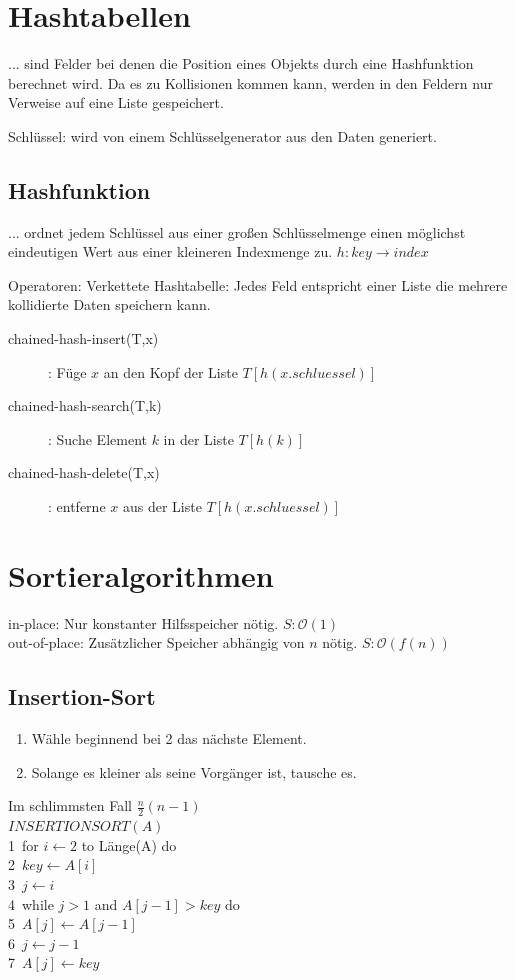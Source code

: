 \documentclass[10pt,a4paper]{scrartcl}
\newcommand{\ra}[0]{\ensuremath{\rightarrow}} 									%
\begin{document}
\section{Hashtabellen}
	... sind Felder bei denen die Position eines Objekts durch eine Hashfunktion berechnet wird. Da es zu Kollisionen kommen kann, werden in den Feldern nur Verweise auf eine Liste gespeichert.

	Schlüssel: wird von einem Schlüsselgenerator aus den Daten generiert. 
	\subsection{Hashfunktion}
	... ordnet jedem Schlüssel aus einer großen Schlüsselmenge einen möglichst eindeutigen Wert aus einer kleineren Indexmenge zu.
	$h: key \ra index$
	
Operatoren:
Verkettete Hashtabelle: Jedes Feld entspricht einer Liste die mehrere kollidierte Daten speichern kann. 
\begin{description}
	\item[chained-hash-insert(T,x)]: Füge $x$ an den Kopf der Liste $T[ h(x.schluessel)]$
	\item[chained-hash-search(T,k)]: Suche Element $k$ in der Liste $T[ h(k) ]$
	\item[chained-hash-delete(T,x)]: entferne $x$ aus der Liste $T[h(x.schluessel)]$
\end{description}




\section{Sortieralgorithmen}
in-place: Nur konstanter Hilfsspeicher nötig. $S:\mathcal O(1)$\\
out-of-place: Zusätzlicher Speicher abhängig von $n$ nötig. $S:\mathcal O(f(n))$\\


\subsection{Insertion-Sort}
\begin{enumerate}
	\item Wähle beginnend bei 2 das nächste Element. 
	\item Solange es kleiner als seine Vorgänger ist, tausche es.
\end{enumerate}
Im schlimmsten Fall $\frac{n}{2}(n-1)$\\
$INSERTIONSORT(A)$\\
1\ for $i ← 2$ to Länge(A) do\\
2\ \quad $key ← A[i]$\\
3\ \quad $j ← i$\\
4\ \quad while $j > 1$ and $A[j-1] > key$ do\\
5\ \qquad 	$A[j] ← A[j - 1]$\\
6\ \qquad 	$j ← j − 1$\\
7\ \quad 	$A[j] ← key$
\end{document}
